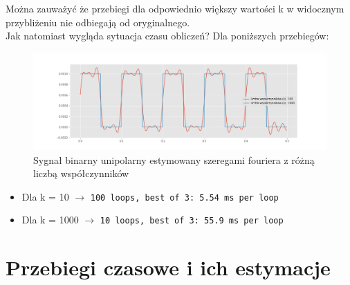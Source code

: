 \documentclass[13pt]{article}
\begin{document}
Można zauważyć że przebiegi dla odpowiednio większy wartości k w widocznym przybliżeniu nie odbiegają od oryginalnego. 
\\Jak natomiast wygląda sytuacja czasu obliczeń? Dla poniższych przebiegów:
\begin{figure}[!h]
	\centering
	\includegraphics[width=\textwidth]{example3.png}
	\caption{Sygnał binarny unipolarny estymowany szeregami fouriera z różną liczbą współczynników}
\end{figure}

\begin{itemize}
\item Dla k = 10 $\rightarrow$ \texttt{100 loops, best of 3: 5.54 ms per loop}
\item Dla k = 1000 $\rightarrow$ \texttt{10 loops, best of 3: 55.9 ms per loop}
\end{itemize}

\newpage

\section{Przebiegi czasowe i ich estymacje}
\end{document}
